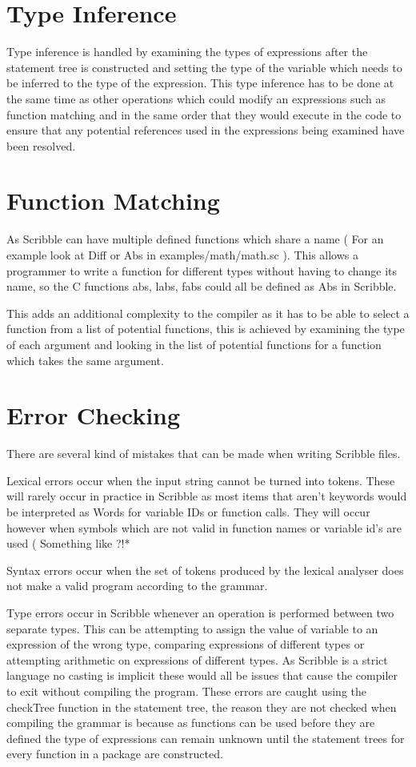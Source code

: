 \documentclass[]{final_report}
\begin{document}
\section{Type Inference}

Type inference is handled by examining the types of expressions after the statement tree is constructed and setting the type of the variable which needs to be inferred to the type of the expression. This type inference has to be done at the same time as other operations which could modify an expressions such as function matching and in the same order that they would execute in the code to ensure that any potential references used in the expressions being examined have been resolved.

\section{Function Matching}

As Scribble can have multiple defined functions which share a name ( For an example look at Diff or Abs in examples/math/math.sc ). This allows a programmer to write a function for different types without having to change its name, so the C functions abs, labs, fabs could all be defined as Abs in Scribble.

This adds an additional complexity to the compiler as it has to be able to select a function from a list of potential functions, this is achieved by examining the type of each argument and looking in the list of potential functions for a function which takes the same argument. 

\section{Error Checking}

There are several kind of mistakes that can be made when writing Scribble files. 

Lexical errors occur when the input string cannot be turned into tokens. These will rarely occur in practice in Scribble as most items that aren't keywords would be interpreted as Words for variable IDs or function calls. They will occur however when symbols which are not valid in function names or variable id's are used ( Something like ?!*%

Syntax errors occur when the set of tokens produced by the lexical analyser does not make a valid program according to the grammar. 

Type errors occur in Scribble whenever an operation is performed between two separate types. This can be attempting to assign the value of variable to an expression of the wrong type, comparing expressions of different types or attempting arithmetic on expressions of different types. As Scribble is a strict language no casting is implicit these would all be issues that cause the compiler to exit without compiling the program. These errors are caught using the checkTree function in the statement tree, the reason they are not checked when compiling the grammar is because as functions can be used before they are defined the type of expressions can remain unknown until the statement trees for every function in a package are constructed.
\end{document}

